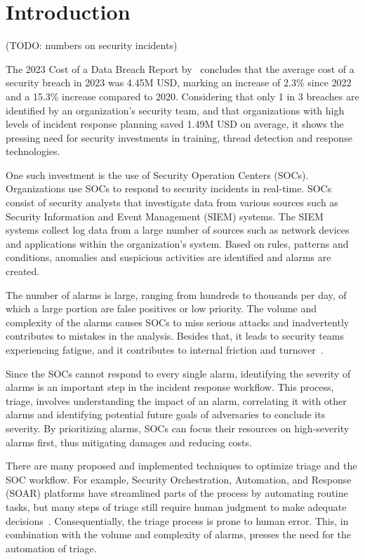 \section{Introduction}
\label{sec:introduction}

(TODO: numbers on security incidents) %

The 2023 Cost of a Data Breach Report by\ \citet{ibm2023cost} concludes that the average cost of a security breach in
2023 was 4.45M USD, marking an increase of 2.3\% since 2022 and a 15.3\% increase compared to 2020.
Considering that only 1 in 3 breaches are identified by an organization's security team, and that organizations with
high levels of incident response planning saved 1.49M USD on average, it shows the pressing need for security
investments in training, thread detection and response technologies.

One such investment is the use of Security Operation Centers (SOCs).
Organizations use SOCs to respond to security incidents in real-time.
SOCs consist of security analysts that investigate data from various sources such as Security Information and Event
Management (SIEM) systems.
The SIEM systems collect log data from a large number of sources such as network devices and applications within the
organization's system.
Based on rules, patterns and conditions, anomalies and suspicious activities are identified and alarms are created.

The number of alarms is large, ranging from hundreds to thousands per day, of which a large portion are false positives
or low priority.
The volume and complexity of the alarms causes SOCs to miss serious attacks and inadvertently contributes to mistakes in
the analysis.
Besides that, it leads to security teams experiencing fatigue, and it contributes to internal friction and
turnover\ \citep{orca2022fatigue}.

Since the SOCs cannot respond to every single alarm, identifying the severity of alarms is an important step in the
incident response workflow.
This process, triage, involves understanding the impact of an alarm, correlating it with other alarms and identifying
potential future goals of adversaries to conclude its severity.
By prioritizing alarms, SOCs can focus their resources on high-severity alarms first, thus mitigating damages and
reducing costs.

There are many proposed and implemented techniques to optimize triage and the SOC workflow.
For example, Security Orchestration, Automation, and Response (SOAR) platforms have streamlined parts of the process by
automating routine tasks, but many steps of triage still require human judgment to make adequate
decisions\ \citep{chuvakin2019triaging}.
Consequentially, the triage process is prone to human error.
This, in combination with the volume and complexity of alarms, presses the need for the automation of triage.

